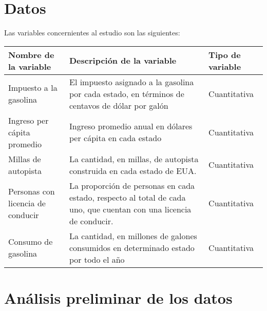 \documentclass[a4paper,10pt]{article}
\begin{document}
\section{Datos}
	Las variables concernientes al estudio son las siguientes:
	\begin{center}
		\begin{tabular}{p{4cm}|p{4cm}|p{2.5cm}}
		Nombre de la variable&Descripción de la variable&Tipo de variable\\
		\hline
		\hline
		Impuesto a la gasolina&El impuesto asignado a la gasolina por cada estado, en términos de centavos de dólar por galón&Cuantitativa\\
		\hline
		Ingreso per cápita promedio&Ingreso promedio anual en dólares per cápita en cada estado&Cuantitativa\\
		\hline
		Millas de autopista&La cantidad, en millas, de autopista construida en cada estado de EUA.&Cuantitativa\\
		\hline
		Personas con licencia de conducir&La proporción de personas en cada estado, respecto al total de cada uno, que cuentan con una licencia de conducir.&Cuantitativa\\
		\hline
		Consumo de gasolina&La cantidad, en millones de galones consumidos en determinado estado por todo el año&Cuantitativa
		\end{tabular}
	\end{center}

\section{Análisis preliminar de los datos}
\end{document}
